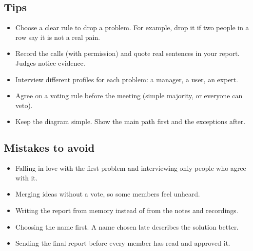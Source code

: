 \documentclass[11pt,a4paper]{article}
\begin{document}
\subsection{Tips}
\begin{itemize}
  \item Choose a clear rule to drop a problem. For example, drop it if two people in a row say it is not a real pain.
  \item Record the calls (with permission) and quote real sentences in your report. Judges notice evidence.
  \item Interview different profiles for each problem: a manager, a user, an expert.
  \item Agree on a voting rule before the meeting (simple majority, or everyone can veto).
  \item Keep the diagram simple. Show the main path first and the exceptions after.
\end{itemize}

\subsection{Mistakes to avoid}
\begin{itemize}
  \item Falling in love with the first problem and interviewing only people who agree with it.
  \item Merging ideas without a vote, so some members feel unheard.
  \item Writing the report from memory instead of from the notes and recordings.
  \item Choosing the name first. A name chosen late describes the solution better.
  \item Sending the final report before every member has read and approved it.
\end{itemize}
\end{document}
